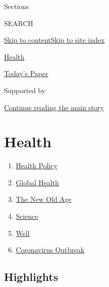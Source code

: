 Sections

SEARCH

\protect\hyperlink{site-content}{Skip to
content}\protect\hyperlink{site-index}{Skip to site index}

\href{https://www.nytimes.com/section/health}{Health}

\href{https://myaccount.nytimes.com/auth/login?response_type=cookie\&client_id=vi}{}

\href{https://www.nytimes.com/section/todayspaper}{Today's Paper}

Supported by

\protect\hyperlink{after-sponsor}{Continue reading the main story}

\hypertarget{health}{%
\section{Health}\label{health}}

\begin{enumerate}
\def\labelenumi{\arabic{enumi}.}
\tightlist
\item
  \href{/section/health/policy}{Health Policy}
\item
  \href{/column/global-health}{Global Health}
\item
  \href{/column/the-new-old-age}{The New Old Age}
\item
  \href{/section/science}{Science}
\item
  \href{/section/well/}{Well}
\item
  \href{/news-event/coronavirus}{Coronavirus Outbreak}
\end{enumerate}

\hypertarget{highlights}{%
\subsection{Highlights}\label{highlights}}

